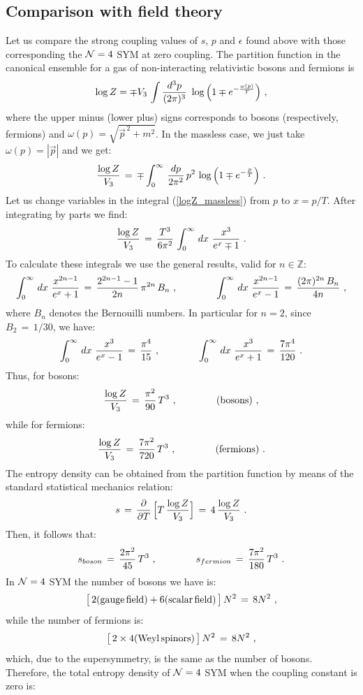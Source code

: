 \documentclass[12pt,notitlepage,a4paper]{article}
\newcommand{\beq}{\begin{equation}}
\newcommand{\eeq}{\end{equation}}
\begin{document}
\subsection{ Comparison with field theory}
Let us compare the strong coupling values of  $s$, $p$ and $\epsilon$  found above with those corresponding the ${\cal N}=4$ SYM at zero coupling.  The partition function in the canonical ensemble for  a gas of  non-interacting relativistic bosons and fermions is 
\beq
\log Z=\mp V_3\,\int {d^3p\over (2\pi)^3}\,\,\log \Big(
1\mp e^{-{\omega(p)\over T}}\Big)\,\,,
\eeq
where  the upper minus (lower plus) signs corresponds to bosons (respectively, fermions) and $\omega(p)=\sqrt{\vec p^{\,2}+m^2}$. In the massless case, we just take $\omega(p)=|\vec p|$ and we get:
\beq
{\log Z\over V_3}\,=\,\mp \int_0^{\infty}\,{dp\over 2\pi^2}\,p^2\,\log\Big(1\mp e^{-{p\over T}}\Big)\,\,.
\label{logZ_massless}
\eeq
Let us change variables in the integral (\ref{logZ_massless}) from $p$ to $x=p/T$. After integrating by parts we find:
\beq
{\log Z\over V_3}\,=\,{T^3\over 6\pi^2}\,\int_{0}^{\infty}\,dx\,\,
{x^3\over e^x\mp 1}\,\,.
\eeq
To calculate these integrals we use the general results, valid for $n\in {\mathbb Z}$:
\beq
\int_{0}^{\infty}\,dx\,\,{x^{2n-1}\over e^x+1}\,=\,{2^{2n-1}-1\over 2n}\,\pi^{2n}\,B_n
\,\,,
\qquad\qquad
\int_{0}^{\infty}\,dx\,\,{x^{2n-1}\over e^x-1}\,=\,{(2\pi)^{2n}\,B_n\over 4n}\,\,,
\eeq
where $B_n$ denotes the Bernouilli numbers. In particular for $n=2$, since 
$B_2\,=\,1/ 30$, we have:
\beq
\int_{0}^{\infty}\,dx\,\,{x^{3}\over e^x-1}\,=\,{\pi^4\over 15}
\,\,,
\qquad\qquad
\int_{0}^{\infty}\,dx\,\,{x^{3}\over e^x+1}\,=\,{7\pi^4\over 120}\,\,.
\eeq
Thus, for bosons:
\beq
{\log Z\over V_3}\,=\,{\pi^2\over 90}\,T^3\,\,,
\qquad\qquad
({\rm bosons})\,\,,
\eeq
while for fermions:
\beq
{\log Z\over V_3}\,=\,{7\pi^2\over 720}\,T^3\,\,,
\qquad\qquad
({\rm fermions})\,\,.
\eeq
The entropy density can be obtained from the partition function by means of the standard 
statistical mechanics relation:
\beq
s\,=\,{\partial \over \partial T}\,\Big[T\,{\log Z\over V_3}\Big]\,=\,4\,{\log Z\over V_3}\,\,.
\eeq
Then, it follows that:
\beq
s_{boson}\,=\,{2\pi^2\over 45}\,T^3
\,\,,
\qquad\qquad
s_{fermion}\,=\,{7\pi^2\over 180}\,T^3\,\,.
\eeq
In ${\cal N}=4$ SYM the number of bosons we have is:
\beq
\big[\,2({\rm gauge \,field})+6 ({\rm scalar \,field})\,\big]\,N^2\,=\,8N^2\,\,,
\eeq
while the number of fermions is:
\beq
\big[\,2\times 4({\rm Weyl\,spinors})\,\big]\,N^2\,=\,8N^2\,\,,
\eeq
which, due to the supersymmetry, is the same as the number of bosons. Therefore, the total entropy  density  of  ${\cal N}=4$ SYM  when the coupling constant is zero is:
\end{document}
